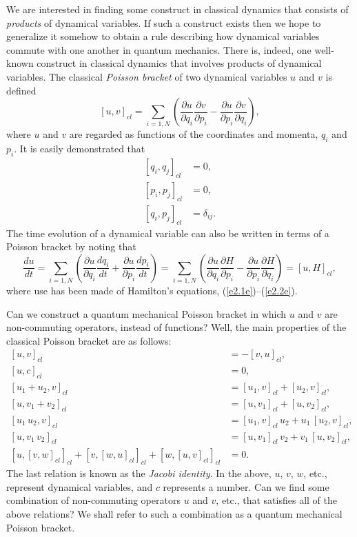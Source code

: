 We are interested in 
finding some
construct in classical dynamics that consists of
{\em products}\/ of dynamical variables. If such a construct exists then we hope to 
generalize it somehow to obtain  a
rule describing how dynamical variables
commute with one another in quantum mechanics. There is, indeed,
 one well-known construct
in classical dynamics that involves products of dynamical variables. The classical 
{\em Poisson bracket}\/ of two dynamical variables $u$ and $v$ is defined
\begin{equation}\label{e3.2}
[u, v]_{cl} = \sum_{i=1,N} \left(\frac{\partial u}{\partial q_i}\frac{\partial v}
{\partial p_i} - \frac{\partial u}{\partial p_i}\frac{\partial v}{\partial q_i}
\right),
\end{equation}
where $u$ and $v$ are regarded as functions of the coordinates 
and momenta, $q_i$ and $p_i$. It is easily demonstrated that
\begin{align}\label{e3.3a}
[q_i, q_j]_{cl} &= 0,\\[0.5ex]
[p_i, p_j]_{cl} &= 0,\\[0.5ex]
[q_i, p_j]_{cl} &= \delta_{ij}.\label{e3.3c}
\end{align}
 The time evolution of a dynamical variable can also
be
written in terms of a Poisson bracket by noting that
\begin{equation}
\frac{du}{dt} = \sum_{i=1,N} \left(\frac{\partial u}{\partial q_i}\frac{d q_i}{dt}
+ \frac{\partial u}{\partial p_i}\frac{dp_i}{dt}\right)
= \sum_{i=1,N} \left(\frac{\partial u}{\partial q_i}\frac{\partial H}{\partial p_i}
-\frac{\partial u}{\partial p_i}\frac{\partial H}{\partial q_i}\right)
=[u, H]_{cl},\label{e3.4}
\end{equation}
where use has been made of Hamilton's equations, (\ref{e2.1e})--(\ref{e2.2e}).

Can we construct a quantum mechanical Poisson bracket in which $u$ and
$v$ are non-commuting operators, instead of functions? Well, the main properties
of the classical Poisson bracket are as follows:
\begin{align}\label{e3.5a}
[u, v]_{cl} &= - [v, u]_{cl},\\[0.5ex]
[u, c]_{cl} &= 0,\\[0.5ex]
[u_1+ u_2, v]_{cl} &= [u_1, v]_{cl} + [u_2, v]_{cl},\\[0.5ex]
[u, v_1 + v_2]_{cl}&= [u, v_1] _{cl}+ [u, v_2]_{cl},\\[0.5ex]
[u_1\, u_2, v]_{cl} &= [u_1, v]_{cl} \,u_2 + u_1\, [u_2, v]_{cl},\label{e3.5e}\\[0.5ex]
[u, v_1 \,v_2]_{cl} &= [u, v_1]_{cl} \,v_2 + v_1 \,[u, v_2]_{cl},\label{e3.5f}\\[0.5ex]
[u, [v, w]_{cl} ]_{cl}+ [v, [w, u]_{cl} ]_{cl} + [w, [u, v]_{cl}]_{cl} &= 0.\label{e3.6}
\end{align}
The last relation is known as the {\em Jacobi identity}. In the above,
$u$, $v$, $w$, {\rm etc.}, represent dynamical variables, and $c$ represents a number.
Can we find some combination of non-commuting operators $u$ and $v$, {\rm etc.}, 
that satisfies all of the above relations? We shall refer to such a combination as a quantum mechanical Poisson bracket. 

